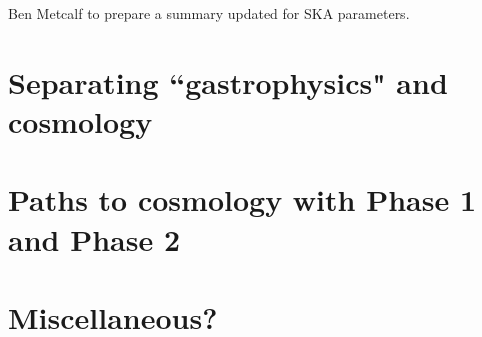 \documentclass{PoS}
\begin{document}
Ben Metcalf to prepare a summary updated for SKA parameters.

\section{Separating ``gastrophysics" and cosmology}

\section{Paths to cosmology with Phase 1 and Phase 2}

\section{Miscellaneous?}



{}

\end{document}
